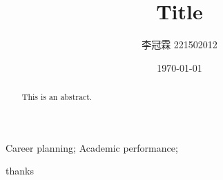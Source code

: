 \documentclass[12pt, a4paper, oneside,UTF8]{ctexart}
\title{Title}
\author{李冠霖 221502012}
\date{\today}
\begin{document}
\maketitle
\tableofcontents
\newpage

\begin{abstract}
    This is an abstract.
\end{abstract}

\begin{keyword}
    Career planning;  %
    Academic performance;  %
\end{keyword}
\newpage
thanks \cite{negru2016longitudinal}



\end{document}
